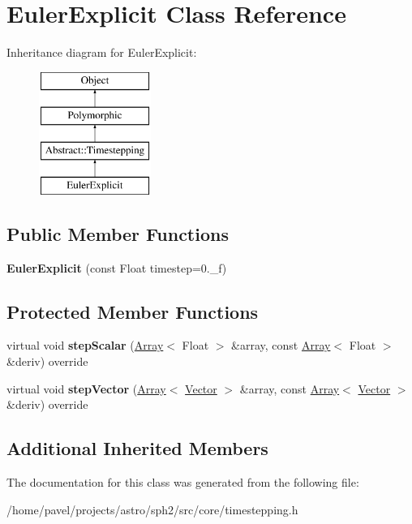 \hypertarget{classEulerExplicit}{}\section{Euler\+Explicit Class Reference}
\label{classEulerExplicit}
Inheritance diagram for Euler\+Explicit\+:\begin{figure}[H]
\begin{center}
\leavevmode
\includegraphics[height=4.000000cm]{classEulerExplicit}
\end{center}
\end{figure}
\subsection*{Public Member Functions}
\begin{DoxyCompactItemize}
\item 
\hypertarget{classEulerExplicit_ad0eb5290cc6b7d10ce961e7e489dea1a}{}\label{classEulerExplicit_ad0eb5290cc6b7d10ce961e7e489dea1a} 
{\bfseries Euler\+Explicit} (const Float timestep=0.\+\_\+f)
\end{DoxyCompactItemize}
\subsection*{Protected Member Functions}
\begin{DoxyCompactItemize}
\item 
\hypertarget{classEulerExplicit_a55222e61b1c3660a5722def70d817cbb}{}\label{classEulerExplicit_a55222e61b1c3660a5722def70d817cbb} 
virtual void {\bfseries step\+Scalar} (\hyperlink{classArray}{Array}$<$ Float $>$ \&array, const \hyperlink{classArray}{Array}$<$ Float $>$ \&deriv) override
\item 
\hypertarget{classEulerExplicit_a0141fd4bf38cd57e6e7ab26d4dc99aab}{}\label{classEulerExplicit_a0141fd4bf38cd57e6e7ab26d4dc99aab} 
virtual void {\bfseries step\+Vector} (\hyperlink{classArray}{Array}$<$ \hyperlink{classBasicVector}{Vector} $>$ \&array, const \hyperlink{classArray}{Array}$<$ \hyperlink{classBasicVector}{Vector} $>$ \&deriv) override
\end{DoxyCompactItemize}
\subsection*{Additional Inherited Members}


The documentation for this class was generated from the following file\+:\begin{DoxyCompactItemize}
\item 
/home/pavel/projects/astro/sph2/src/core/timestepping.\+h\end{DoxyCompactItemize}
